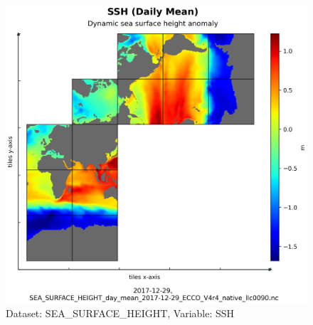 \begin{figure}[H]
\centering
\includegraphics[scale=0.55]{../images/plots/native_plots/Sea_Surface_Height/SSH.png}
\caption{Dataset: SEA\_SURFACE\_HEIGHT, Variable: SSH}
\label{tab:table-SEA_SURFACE_HEIGHT_SSH-Plot}
\end{figure}
\pagebreak
